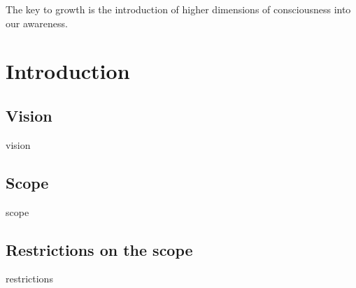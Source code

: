 
\begin{savequote}[10pc]
\sffamily
The key to growth is the introduction of higher dimensions of consciousness into our awareness. 
\end{savequote}

\chapter{Introduction}
\label{chap:introduction}
\section{Vision}
vision

\section{Scope}
scope

\section{Restrictions on the scope}
restrictions